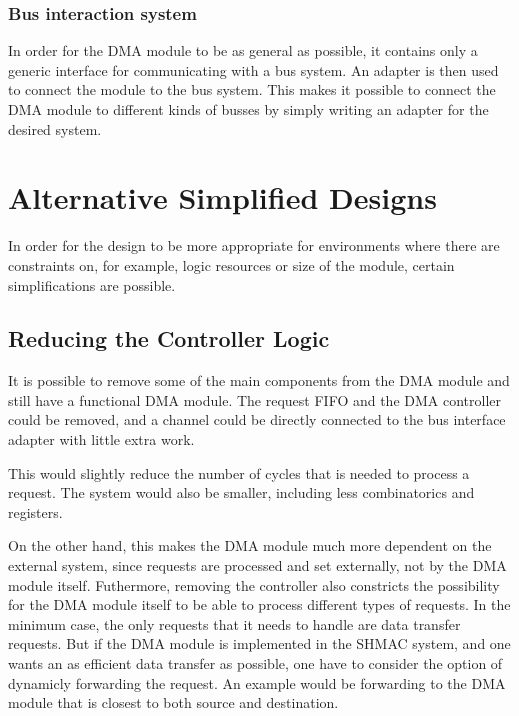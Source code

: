 \subsubsection{Bus interaction system}
In order for the DMA module to be as general as possible, it contains only a generic
interface for communicating with a bus system. An adapter is then used to connect
the module to the bus system. This makes it possible to connect the DMA module to
different kinds of busses by simply writing an adapter for the desired system.

\section{Alternative Simplified Designs} 

In order for the design to be more appropriate for environments where there are
constraints on, for example, logic resources or size of the module, certain simplifications
are possible.


\subsection{Reducing the Controller Logic}
It is possible to remove some of the main components from the DMA module and still
have a functional DMA module. The request FIFO and the DMA controller could be removed,
and a channel could be directly connected to the bus interface adapter with little
extra work.

This would slightly reduce the number of cycles that is needed to process a request.
The system would also be smaller, including less combinatorics and registers.

On the other hand, this makes the DMA module much more dependent on the external system, since requests are processed and set externally, not by the DMA module itself.
Futhermore, removing the controller also constricts the possibility for the DMA module itself to be able to process different types of requests.
In the minimum case, the only requests that it needs to handle are data transfer requests.
But if the DMA module is implemented in the SHMAC system, and one wants an as efficient data transfer as possible, one have to consider the option of dynamicly forwarding the request.
An example would be forwarding to the DMA module that is  closest to both source and destination.

